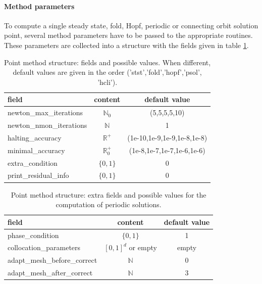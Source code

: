 \documentclass[10pt]{article}
\gdef \RR{{\mathbb R}}
\gdef \NN{{\mathbb N}}
\begin{document}
{\paragraph{Method parameters}

To compute a single steady state, fold, Hopf, periodic 
or connecting
orbit solution point,
several method parameters have to be passed to the appropriate routines.
These parameters are collected into a structure with the fields
given in table \ref{point_method_structures}.

\begin{table}[h]
\begin{center}
\begin{tabular}{l|c|c}
field                      & content     & default value  \\\hline 
newton\_max\_iterations    & $\NN_0$     & (5,5,5,5,10) \\
newton\_nmon\_iterations   & $\NN$       & 1 \\
halting\_accuracy          & $\RR^+$     & (1e-10,1e-9,1e-9,1e-8,1e-8) \\
minimal\_accuracy          & $\RR^+_0$   & (1e-8,1e-7,1e-7,1e-6,1e-6) \\
extra\_condition           & $\{0,1\}$   & 0 \\
print\_residual\_info      & $\{0,1\}$   & 0
\end{tabular}
\end{center}
\caption{\small\label{point_method_structures}
Point method structure: fields and possible values. When different,
default values are given in the order ('stst','fold','hopf','psol', 'hcli').}
\end{table} 

\begin{table}[h]
\begin{center}
\begin{tabular}{l|c|c}
field                        & content            & default value  \\\hline   
phase\_condition             & $\{0,1\}$          & 1 \\
collocation\_parameters      & $[0,1]^d$ or empty & empty \\
adapt\_mesh\_before\_correct & $\NN$              & 0 \\
adapt\_mesh\_after\_correct  & $\NN$              & 3 
\end{tabular}
\end{center}
\caption{\small\label{psol_extra_p_struct}
Point method structure: extra fields and possible values
for the computation of periodic solutions.}
\end{table}

}
\end{document}
